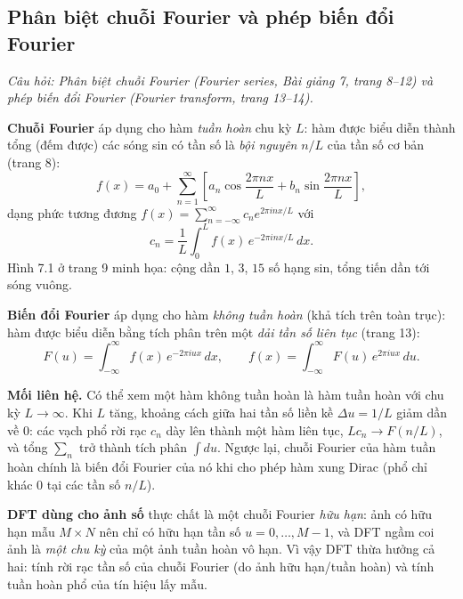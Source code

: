 \subsection{Phân biệt chuỗi Fourier và phép biến đổi Fourier}
\label{subsec:w7_series_vs_transform}

\textit{Câu hỏi: Phân biệt chuỗi Fourier (Fourier series, Bài giảng 7, trang 8--12) và phép biến đổi Fourier (Fourier transform, trang 13--14).}

\textbf{Chuỗi Fourier} áp dụng cho hàm \emph{tuần hoàn} chu kỳ $L$: hàm được biểu diễn thành tổng (đếm được) các sóng sin có tần số là \emph{bội nguyên} $n/L$ của tần số cơ bản (trang 8):
\begin{equation}
f(x) = a_0 + \sum_{n=1}^{\infty}\left[a_n\cos\frac{2\pi n x}{L} + b_n\sin\frac{2\pi n x}{L}\right],
\end{equation}
dạng phức tương đương $f(x) = \sum_{n=-\infty}^{\infty} c_n e^{2\pi i n x/L}$ với
\begin{equation}
c_n = \frac{1}{L}\int_0^L f(x)\,e^{-2\pi i n x / L}\,dx.
\end{equation}
Hình 7.1 ở trang 9 minh họa: cộng dần $1$, $3$, $15$ số hạng sin, tổng tiến dần tới sóng vuông.

\textbf{Biến đổi Fourier} áp dụng cho hàm \emph{không tuần hoàn} (khả tích trên toàn trục): hàm được biểu diễn bằng tích phân trên một \emph{dải tần số liên tục} (trang 13):
\begin{equation}
F(u) = \int_{-\infty}^{\infty} f(x)\,e^{-2\pi i u x}\,dx, \qquad f(x) = \int_{-\infty}^{\infty} F(u)\,e^{2\pi i u x}\,du.
\end{equation}

\textbf{Mối liên hệ.} Có thể xem một hàm không tuần hoàn là hàm tuần hoàn với chu kỳ $L \to \infty$. Khi $L$ tăng, khoảng cách giữa hai tần số liền kề $\Delta u = 1/L$ giảm dần về $0$: các vạch phổ rời rạc $c_n$ dày lên thành một hàm liên tục, $L c_n \to F(n/L)$, và tổng $\sum_n$ trở thành tích phân $\int du$. Ngược lại, chuỗi Fourier của hàm tuần hoàn chính là biến đổi Fourier của nó khi cho phép hàm xung Dirac (phổ chỉ khác $0$ tại các tần số $n/L$).

\textbf{DFT dùng cho ảnh số} thực chất là một chuỗi Fourier \emph{hữu hạn}: ảnh có hữu hạn mẫu $M \times N$ nên chỉ có hữu hạn tần số $u = 0, \ldots, M - 1$, và DFT ngầm coi ảnh là \emph{một chu kỳ} của một ảnh tuần hoàn vô hạn. Vì vậy DFT thừa hưởng cả hai: tính rời rạc tần số của chuỗi Fourier (do ảnh hữu hạn/tuần hoàn) và tính tuần hoàn phổ của tín hiệu lấy mẫu.

